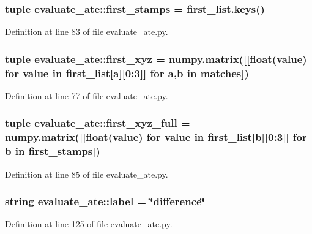 \subsubsection[{first\-\_\-stamps}]{\setlength{\rightskip}{0pt plus 5cm}tuple {\bf evaluate\-\_\-ate\-::first\-\_\-stamps} = first\-\_\-list.\-keys()}\label{namespaceevaluate__ate_a3cf492f1cea1f729470b37f5f62a98a9}


\-Definition at line 83 of file evaluate\-\_\-ate.\-py.

\subsubsection[{first\-\_\-xyz}]{\setlength{\rightskip}{0pt plus 5cm}tuple {\bf evaluate\-\_\-ate\-::first\-\_\-xyz} = numpy.\-matrix([[float(value) for value in {\bf first\-\_\-list}[a][0\-:3]] for a,b in {\bf matches}])}\label{namespaceevaluate__ate_af9acc793f205ea1d6f48ac11128ce581}


\-Definition at line 77 of file evaluate\-\_\-ate.\-py.

\subsubsection[{first\-\_\-xyz\-\_\-full}]{\setlength{\rightskip}{0pt plus 5cm}tuple {\bf evaluate\-\_\-ate\-::first\-\_\-xyz\-\_\-full} = numpy.\-matrix([[float(value) for value in {\bf first\-\_\-list}[b][0\-:3]] for b in {\bf first\-\_\-stamps}])}\label{namespaceevaluate__ate_a965b6e55646f6ad712bc790249632b90}


\-Definition at line 85 of file evaluate\-\_\-ate.\-py.

\subsubsection[{label}]{\setlength{\rightskip}{0pt plus 5cm}string {\bf evaluate\-\_\-ate\-::label} = \char`\"{}difference\char`\"{}}\label{namespaceevaluate__ate_aef6c3dcd3a519081b360b7061a72e7b7}


\-Definition at line 125 of file evaluate\-\_\-ate.\-py.

